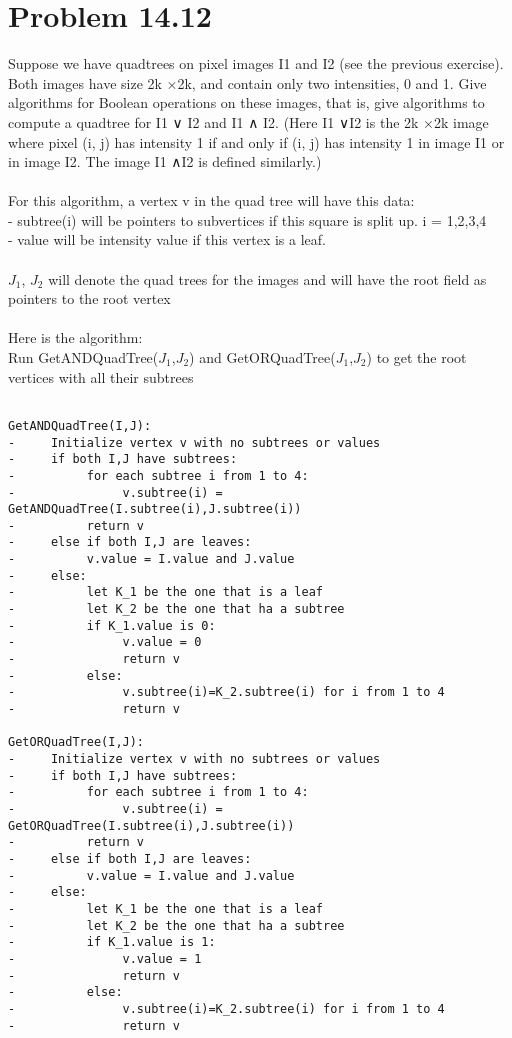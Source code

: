 \documentclass[11pt,psfig]{article}
\begin{document}
\section*{Problem 14.12}

Suppose we have quadtrees on pixel images I1 and I2 (see the previous
exercise). Both images have size 2k ×2k, and contain only two intensities,
0 and 1. Give algorithms for Boolean operations on these images,
that is, give algorithms to compute a quadtree for I1 ∨ I2 and I1 ∧ I2.
(Here I1 ∨I2 is the 2k ×2k image where pixel (i, j) has intensity 1 if and
only if (i, j) has intensity 1 in image I1 or in image I2. The image I1 ∧I2
is defined similarly.)\\
\\
For this algorithm, a vertex v in the quad tree will have this data:\\
- subtree(i) will be pointers to subvertices if this square is split up. i = 1,2,3,4\\
- value will be intensity value if this vertex is a leaf. \\
\\
$J_1$, $J_2$ will denote the quad trees for the images and will have the root field as pointers to the root vertex \\
\\
Here is the algorithm:\\
Run GetANDQuadTree($J_1$,$J_2$) and GetORQuadTree($J_1$,$J_2$) to get the root vertices with all their subtrees\\

\begin{verbatim}

GetANDQuadTree(I,J):
-     Initialize vertex v with no subtrees or values
-     if both I,J have subtrees:
-          for each subtree i from 1 to 4:
-               v.subtree(i) = GetANDQuadTree(I.subtree(i),J.subtree(i))
-          return v
-     else if both I,J are leaves:
-          v.value = I.value and J.value
-     else:
-          let K_1 be the one that is a leaf
-          let K_2 be the one that ha a subtree
-          if K_1.value is 0:
-               v.value = 0
-               return v
-          else:
-               v.subtree(i)=K_2.subtree(i) for i from 1 to 4
-               return v

GetORQuadTree(I,J):
-     Initialize vertex v with no subtrees or values
-     if both I,J have subtrees:
-          for each subtree i from 1 to 4:
-               v.subtree(i) = GetORQuadTree(I.subtree(i),J.subtree(i))
-          return v
-     else if both I,J are leaves:
-          v.value = I.value and J.value
-     else:
-          let K_1 be the one that is a leaf
-          let K_2 be the one that ha a subtree
-          if K_1.value is 1:
-               v.value = 1
-               return v
-          else:
-               v.subtree(i)=K_2.subtree(i) for i from 1 to 4
-               return v

\end{verbatim}


\end{document}
